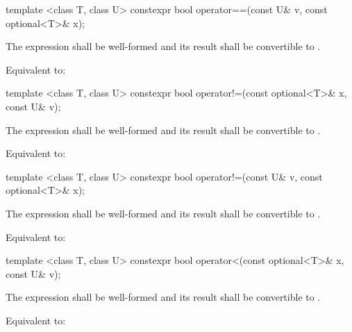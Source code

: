 %
\begin{itemdecl}
template <class T, class U> constexpr bool operator==(const U& v, const optional<T>& x);
\end{itemdecl}

\begin{itemdescr}
\pnum
\requires
The expression  shall be well-formed and
its result shall be convertible to .

\pnum
\effects
Equivalent to: 
\end{itemdescr}

%
\begin{itemdecl}
template <class T, class U> constexpr bool operator!=(const optional<T>& x, const U& v);
\end{itemdecl}

\begin{itemdescr}
\pnum
\requires
The expression  shall be well-formed and
its result shall be convertible to .

\pnum
\effects
Equivalent to: 
\end{itemdescr}

%
\begin{itemdecl}
template <class T, class U> constexpr bool operator!=(const U& v, const optional<T>& x);
\end{itemdecl}

\begin{itemdescr}
\pnum
\requires
The expression  shall be well-formed and
its result shall be convertible to .

\pnum
\effects
Equivalent to: 
\end{itemdescr}

%
\begin{itemdecl}
template <class T, class U> constexpr bool operator<(const optional<T>& x, const U& v);
\end{itemdecl}

\begin{itemdescr}
\pnum
\requires
The expression  shall be well-formed and
its result shall be convertible to .

\pnum
\effects
Equivalent to: 
\end{itemdescr}

